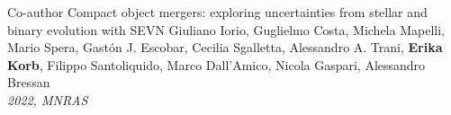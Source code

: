 %
%
%

\begin{experiences}
    \publication
    {Co-author}   {Compact object mergers: exploring uncertainties from stellar and binary evolution with SEVN}
    {Giuliano Iorio, Guglielmo Costa, Michela Mapelli, Mario Spera, Gastón J. Escobar, Cecilia Sgalletta, Alessandro A. Trani, \textbf{Erika Korb}, Filippo Santoliquido, Marco Dall'Amico, Nicola Gaspari, Alessandro Bressan \\
    \textit{2022, MNRAS} \\
                     }
\end{experiences}
